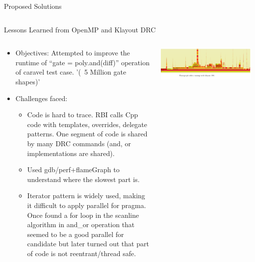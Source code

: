 \documentclass[aspectratio=169]{beamer} %
\begin{document}
\begin{frame}{Proposed Solutions}
\begin{columns}[T]
\begin{column}{.4\textwidth}
\begin{center}
            \end{center}
            \end{column}
        \end{columns}
    \end{frame}
    

\begin{frame}{Lessons Learned from OpenMP and Klayout DRC}
    \begin{columns}[T]
        \begin{column}{.6\textwidth}
            \begin{itemize}
                \item Objectives: Attempted to improve the runtime of ``gate = poly.and(diff)'' operation of caravel test case. '(~5 Million gate shapes)'
                \item Challenges faced:
                    \begin{itemize}
                        \item Code is hard to trace. RBI calls Cpp code with templates, overrides, delegate patterns. One segment of code is shared by many DRC commands (and, or implementations are shared).
                        \item Used gdb/perf+flameGraph to understand where the slowest part is.
                        \item Iterator pattern is widely used, making it difficult to apply parallel for pragma. Once found a for loop in the scanline algorithm in and\_or operation that seemed to be a good parallel for candidate but later turned out that part of code is not reentrant/thread safe.
                    \end{itemize}
            \end{itemize}

        \end{column}
        \begin{column}{.4\textwidth}
            \begin{center}
                \includegraphics[width=\textwidth,height=0.8\textheight,keepaspectratio]{flame.png}
            \end{center}
        \end{column}
    \end{columns}
\end{frame}
\end{document}
